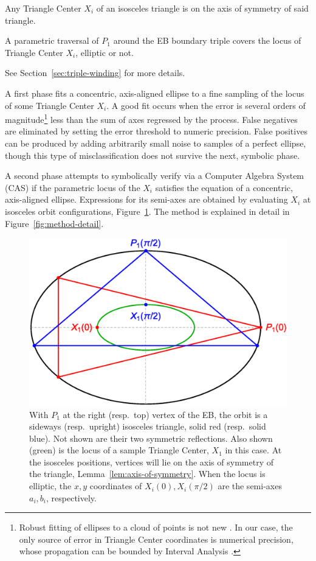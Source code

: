 \begin{lemma}
\label{lem:axis-of-symmetry}
Any Triangle Center $X_i$ of an isosceles triangle is on the axis of symmetry of said triangle.
\end{lemma}

\begin{lemma}
\label{lem:center-cover}
A parametric traversal of $P_1$ around the EB boundary triple covers the locus of Triangle Center $X_i$, elliptic or not.
\end{lemma}

See Section~\ref{sec:triple-winding} for more details.

A first phase fits a concentric, axis-aligned ellipse to a fine sampling of the locus of some Triangle Center $X_i$. A good fit occurs when the error is several orders of magnitude\footnote{Robust fitting of ellipses to a cloud of points is not new \cite{fitzgibbon99-ellipse}. In our case, the only source of error in Triangle Center coordinates is numerical precision, whose propagation can be bounded by Interval Analysis \cite{moore2009-interval-analysis,snyder92-ellipse}.} less than the sum of axes regressed by the process. False negatives are eliminated by setting the error threshold to numeric precision. False positives can be produced by adding arbitrarily small noise to samples of a perfect ellipse, though this type of misclassification does not survive the next, symbolic phase. 

A second phase attempts to symbolically verify via a Computer Algebra System (CAS) if the parametric locus of the $X_i$ satisfies the equation of a concentric, axis-aligned ellipse. Expressions for its semi-axes are obtained by evaluating $X_i$ at isosceles orbit configurations, Figure~\ref{fig:sideways-upright-orbit}. The method is explained in detail in Figure~\ref{fig:method-detail}.

\begin{figure}
    \centering
    \includegraphics[width=.5\textwidth]{pics_1060_two_isosceles}
    \caption{With $P_1$ at the right (resp.~top) vertex of the EB, the orbit is a sideways (resp.~upright) isosceles triangle, solid red (resp.~solid blue). Not shown are their two symmetric reflections. Also shown (green) is the locus of a sample Triangle Center, $X_1$ in this case. At the isosceles positions, vertices will lie on the axis of symmetry of the triangle, Lemma~\ref{lem:axis-of-symmetry}. When the locus is elliptic, the $x,y$ coordinates of $X_i(0),X_i(\pi/2)$ are the semi-axes $a_i,b_i$, respectively.}
    \label{fig:sideways-upright-orbit}
\end{figure}

